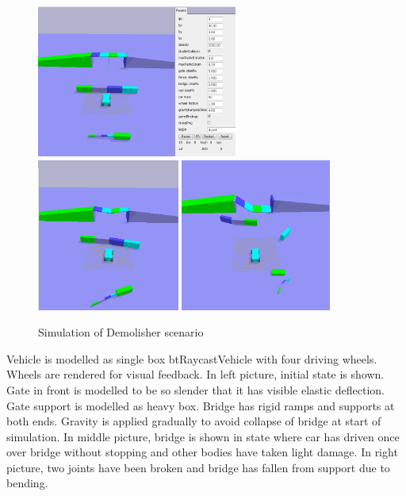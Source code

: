 \begin{figure}[htb!]
\centering
\includegraphics[height=5cm]{figs/demolisher-pre}
\includegraphics[height=5cm]{figs/demolisher-wip}
\includegraphics[height=5cm]{figs/demolisher-done}
\caption{Simulation of Demolisher scenario}
\label{fig:demolisher}
\end{figure}

Vehicle is modelled as single box btRaycastVehicle with four driving wheels. Wheels are rendered for visual feedback.
In left picture, initial state is shown. Gate in front is modelled to be so slender that it has visible elastic deflection.
Gate support is modelled as heavy box.
Bridge has rigid ramps and supports at both ends.
Gravity is applied gradually to avoid collapse of bridge at start of simulation.
In middle picture,  bridge is shown in state where car has driven once over bridge without stopping and
other bodies have taken light damage.
In right picture, two joints have been broken and bridge has fallen from support due to bending.

